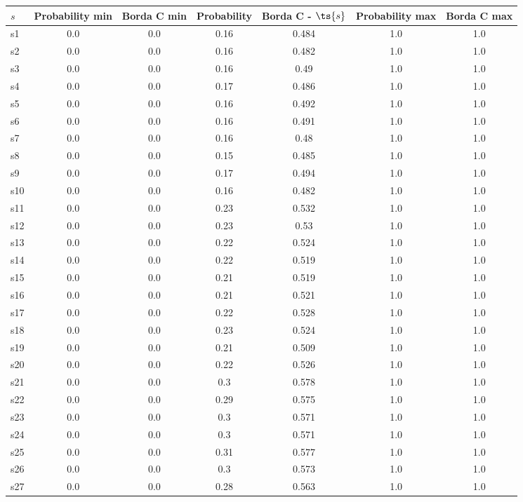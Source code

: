 \documentclass{article}
\begin{document}
\noindent\begin{tabular}{|l|c|c|c|c|c|c|}
\hline
$s$& Probability min & Borda C min & Probability & Borda C - $\ts{s}$ & Probability max & Borda C max\\
\hline
s1 &0.0 & 0.0 & 0.16 & 0.484 & 1.0 & 1.0\\
\hline
s2 &0.0 & 0.0 & 0.16 & 0.482 & 1.0 & 1.0\\
\hline
s3 &0.0 & 0.0 & 0.16 & 0.49 & 1.0 & 1.0\\
\hline
s4 &0.0 & 0.0 & 0.17 & 0.486 & 1.0 & 1.0\\
\hline
s5 &0.0 & 0.0 & 0.16 & 0.492 & 1.0 & 1.0\\
\hline
s6 &0.0 & 0.0 & 0.16 & 0.491 & 1.0 & 1.0\\
\hline
s7 &0.0 & 0.0 & 0.16 & 0.48 & 1.0 & 1.0\\
\hline
s8 &0.0 & 0.0 & 0.15 & 0.485 & 1.0 & 1.0\\
\hline
s9 &0.0 & 0.0 & 0.17 & 0.494 & 1.0 & 1.0\\
\hline
s10 &0.0 & 0.0 & 0.16 & 0.482 & 1.0 & 1.0\\
\hline
s11 &0.0 & 0.0 & 0.23 & 0.532 & 1.0 & 1.0\\
\hline
s12 &0.0 & 0.0 & 0.23 & 0.53 & 1.0 & 1.0\\
\hline
s13 &0.0 & 0.0 & 0.22 & 0.524 & 1.0 & 1.0\\
\hline
s14 &0.0 & 0.0 & 0.22 & 0.519 & 1.0 & 1.0\\
\hline
s15 &0.0 & 0.0 & 0.21 & 0.519 & 1.0 & 1.0\\
\hline
s16 &0.0 & 0.0 & 0.21 & 0.521 & 1.0 & 1.0\\
\hline
s17 &0.0 & 0.0 & 0.22 & 0.528 & 1.0 & 1.0\\
\hline
s18 &0.0 & 0.0 & 0.23 & 0.524 & 1.0 & 1.0\\
\hline
s19 &0.0 & 0.0 & 0.21 & 0.509 & 1.0 & 1.0\\
\hline
s20 &0.0 & 0.0 & 0.22 & 0.526 & 1.0 & 1.0\\
\hline
s21 &0.0 & 0.0 & 0.3 & 0.578 & 1.0 & 1.0\\
\hline
s22 &0.0 & 0.0 & 0.29 & 0.575 & 1.0 & 1.0\\
\hline
s23 &0.0 & 0.0 & 0.3 & 0.571 & 1.0 & 1.0\\
\hline
s24 &0.0 & 0.0 & 0.3 & 0.571 & 1.0 & 1.0\\
\hline
s25 &0.0 & 0.0 & 0.31 & 0.577 & 1.0 & 1.0\\
\hline
s26 &0.0 & 0.0 & 0.3 & 0.573 & 1.0 & 1.0\\
\hline
s27 &0.0 & 0.0 & 0.28 & 0.563 & 1.0 & 1.0\\

\end{tabular}
\end{document}

